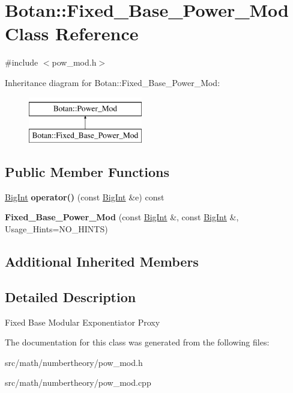 \hypertarget{classBotan_1_1Fixed__Base__Power__Mod}{\section{Botan\-:\-:Fixed\-\_\-\-Base\-\_\-\-Power\-\_\-\-Mod Class Reference}
\label{classBotan_1_1Fixed__Base__Power__Mod}
}


{\ttfamily \#include $<$pow\-\_\-mod.\-h$>$}

Inheritance diagram for Botan\-:\-:Fixed\-\_\-\-Base\-\_\-\-Power\-\_\-\-Mod\-:\begin{figure}[H]
\begin{center}
\leavevmode
\includegraphics[height=2.000000cm]{classBotan_1_1Fixed__Base__Power__Mod}
\end{center}
\end{figure}
\subsection*{Public Member Functions}
\begin{DoxyCompactItemize}
\item 
\hypertarget{classBotan_1_1Fixed__Base__Power__Mod_ac670ba457c1022e31b071961ef261063}{\hyperlink{classBotan_1_1BigInt}{Big\-Int} {\bfseries operator()} (const \hyperlink{classBotan_1_1BigInt}{Big\-Int} \&e) const }\label{classBotan_1_1Fixed__Base__Power__Mod_ac670ba457c1022e31b071961ef261063}

\item 
\hypertarget{classBotan_1_1Fixed__Base__Power__Mod_adfb45de868df4b850bca279d910267ac}{{\bfseries Fixed\-\_\-\-Base\-\_\-\-Power\-\_\-\-Mod} (const \hyperlink{classBotan_1_1BigInt}{Big\-Int} \&, const \hyperlink{classBotan_1_1BigInt}{Big\-Int} \&, Usage\-\_\-\-Hints=N\-O\-\_\-\-H\-I\-N\-T\-S)}\label{classBotan_1_1Fixed__Base__Power__Mod_adfb45de868df4b850bca279d910267ac}

\end{DoxyCompactItemize}
\subsection*{Additional Inherited Members}


\subsection{Detailed Description}
Fixed Base Modular Exponentiator Proxy 

The documentation for this class was generated from the following files\-:\begin{DoxyCompactItemize}
\item 
src/math/numbertheory/pow\-\_\-mod.\-h\item 
src/math/numbertheory/pow\-\_\-mod.\-cpp\end{DoxyCompactItemize}
